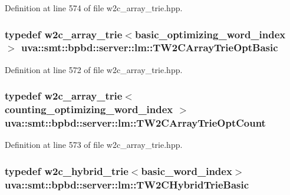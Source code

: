 Definition at line 574 of file w2c\+\_\+array\+\_\+trie.\+hpp.

\hypertarget{namespaceuva_1_1smt_1_1bpbd_1_1server_1_1lm_a5b81ed7605907b5c0f90b9f86b8a32b4}{}
\subsubsection[{T\+W2\+C\+Array\+Trie\+Opt\+Basic}]{\setlength{\rightskip}{0pt plus 5cm}typedef {\bf w2c\+\_\+array\+\_\+trie}$<${\bf basic\+\_\+optimizing\+\_\+word\+\_\+index} $>$ {\bf uva\+::smt\+::bpbd\+::server\+::lm\+::\+T\+W2\+C\+Array\+Trie\+Opt\+Basic}}\label{namespaceuva_1_1smt_1_1bpbd_1_1server_1_1lm_a5b81ed7605907b5c0f90b9f86b8a32b4}


Definition at line 572 of file w2c\+\_\+array\+\_\+trie.\+hpp.

\hypertarget{namespaceuva_1_1smt_1_1bpbd_1_1server_1_1lm_a68fd75184c9fd7f75b30d5b6c0724a8d}{}
\subsubsection[{T\+W2\+C\+Array\+Trie\+Opt\+Count}]{\setlength{\rightskip}{0pt plus 5cm}typedef {\bf w2c\+\_\+array\+\_\+trie}$<${\bf counting\+\_\+optimizing\+\_\+word\+\_\+index} $>$ {\bf uva\+::smt\+::bpbd\+::server\+::lm\+::\+T\+W2\+C\+Array\+Trie\+Opt\+Count}}\label{namespaceuva_1_1smt_1_1bpbd_1_1server_1_1lm_a68fd75184c9fd7f75b30d5b6c0724a8d}


Definition at line 573 of file w2c\+\_\+array\+\_\+trie.\+hpp.

\hypertarget{namespaceuva_1_1smt_1_1bpbd_1_1server_1_1lm_a4113d4b6465f3f52c777cd02a6127488}{}
\subsubsection[{T\+W2\+C\+Hybrid\+Trie\+Basic}]{\setlength{\rightskip}{0pt plus 5cm}typedef {\bf w2c\+\_\+hybrid\+\_\+trie}$<${\bf basic\+\_\+word\+\_\+index}$>$ {\bf uva\+::smt\+::bpbd\+::server\+::lm\+::\+T\+W2\+C\+Hybrid\+Trie\+Basic}}\label{namespaceuva_1_1smt_1_1bpbd_1_1server_1_1lm_a4113d4b6465f3f52c777cd02a6127488}


